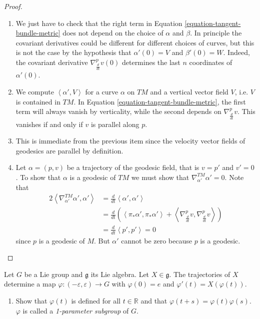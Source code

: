 \begin{proof}
\begin{enumerate}
\item We just have to check that the right
term in
Equation \ref{equation-tangent-bundle-metric}
does not depend on the choice of $\alpha$ and
$\beta$.
In principle the covariant derivatives could
be different
for different choices of curves, but this is
not the
case by the hypothesis that $\alpha'(0)=V$
and $\beta'(0)=W$.
Indeed, the covariant derivative
$\nabla_{\frac{d}{dt}}^pv(0)$
determines the last $n$ coordinates of
$\alpha'(0)$.

\item We compute $\left\langle{}\alpha',V\right\rangle{}$ for
a curve $\alpha$ on $TM$
and a vertical vector field $V$, i.e. $V$ is
contained in $TM$.
In Equation
\ref{equation-tangent-bundle-metric},
the first term will always vanish by
verticality,
while the second depends on
$\nabla_{\frac{d}{dt}}^pv$.
This vanishes if and only if $v$ is parallel
along $p$.

\item This is immediate from the previous
item
since the velocity vector fields of geodesics
are parallel by definition.

\item Let $\alpha=(p,v)$ be a trajectory of
the geodesic field,
that is $v=p'$ and $v'=0$.
To show that $\alpha$ is a geodesic of $TM$
we must show that
$\nabla_{\alpha'}^{TM}\alpha'=0$.
Note that
$$
\begin{aligned}
2\left\langle{}\nabla_{\alpha'}^{TM}\alpha',
\alpha'\right\rangle{}
&=\frac{d}{dt}\left\langle{}\alpha',\alpha'\right\rangle{}\\
&=\frac{d}{dt}\left(\left\langle{}\pi_*\alpha',
\pi_*\alpha'\right\rangle{}
+\left\langle{}\nabla_{\frac{d}{dt}}^pv,
\nabla_{\frac{d}{dt}}^pv\right\rangle{}\right)\\
&=\frac{d}{dt}\left\langle{}p',p'\right\rangle{}=0
\end{aligned}
$$
since $p$ is a geodesic of $M$.
But $\alpha'$ cannot be zero because $p$ is a
geodesic.
\end{enumerate}
\end{proof}

\begin{exercise}
\label{exercise-lie-group-bi-invar-metri}
Let $G$ be a Lie group and $\mathfrak{g}$ its
Lie algebra.
Let $X \in \mathfrak{g}$. The trajectories of
$X$
determine a map
$\varphi:(-\varepsilon,\varepsilon) \to G$
with $\varphi(0)=e$ and
$\varphi'(t)=X(\varphi(t))$.

\begin{enumerate}
\item Show that $\varphi(t)$ is defined for
all $t \in \mathbb{R}$
and that $\varphi(t+s)=\varphi(t)\varphi(s)$.
$\varphi$ is called a {\it 1-parameter
subgroup} of $G$.
\end{enumerate}
\end{exercise}

